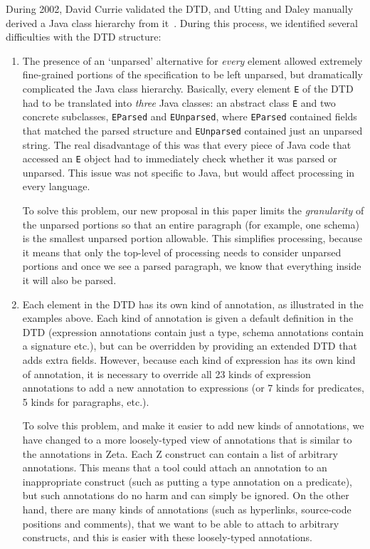 \documentclass{llncs}  %
\newcommand{\Zeta}{Zeta}
\begin{document}
During 2002, David Currie validated the DTD, and Utting and Daley
manually derived a Java class hierarchy from it~\cite{daley:report02}.
During this process, we identified several difficulties with the
DTD structure:

\begin{enumerate}
\item The presence of an `unparsed' alternative for \emph{every} element
  allowed extremely fine-grained portions of the specification to be left
  unparsed, but dramatically complicated the Java class hierarchy.
  Basically, every element \verb!E! of the DTD had to be translated into
  \emph{three} Java classes: an abstract class \verb!E! and two concrete 
  subclasses, \verb!EParsed! and \verb!EUnparsed!, where \verb!EParsed!
  contained fields that matched the parsed structure and \verb!EUnparsed!
  contained just an unparsed string.  The real disadvantage of this was
  that every piece of Java code that accessed an \verb!E! object had to
  immediately check whether it was parsed or unparsed.  This issue was not
  specific to Java, but would affect processing in every language.
  
  To solve this problem, our new proposal in this paper limits the
  \emph{granularity} of the unparsed portions so that an entire paragraph
  (for example, one schema) is the smallest
  unparsed portion allowable.  This simplifies processing, because it means
  that only the top-level of processing needs to consider unparsed portions
  and once we see a parsed paragraph, we know that everything inside it
  will also be parsed.

\item Each element in the DTD has its own kind of annotation, as
  illustrated in the examples above.  Each kind of annotation is given
  a default definition in the DTD (expression annotations contain just a
  type, schema annotations contain a signature etc.), but can be
  overridden by providing an extended DTD that adds extra fields.
  However, because each kind of expression has its own kind of annotation,
  it is necessary to override all 23 kinds of expression annotations
  to add a new annotation to expressions (or 7 kinds for predicates, 
  5 kinds for paragraphs, etc.).
  
  To solve this problem, and make it easier to add new kinds of
  annotations, we have changed to a more loosely-typed view of annotations
  that is similar to the annotations in \Zeta.  Each Z construct can contain
  a list of arbitrary annotations.  This
  means that a tool could attach an annotation to an inappropriate
  construct (such as putting a type annotation on a predicate), but such
  annotations do no harm and can simply be ignored.  On the other hand,
  there are many kinds of annotations (such as hyperlinks, source-code
  positions and comments), that we want to be able to attach to arbitrary
  constructs, and this is easier with these loosely-typed annotations.
  

\end{enumerate}
\end{document}

